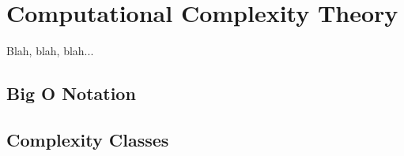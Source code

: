 
\toclineskip
\section{Computational Complexity Theory}

Blah, blah, blah... \\


\subsection{Big O Notation}


\subsection{Complexity Classes}



\newpage


